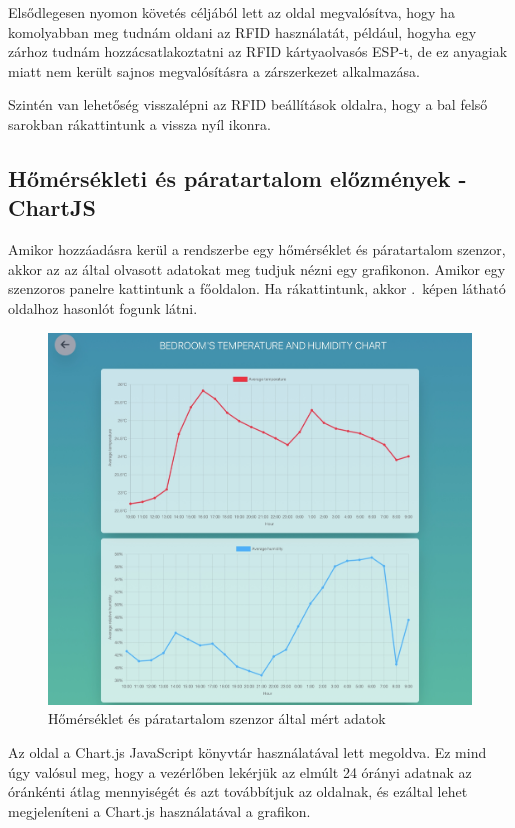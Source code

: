\documentclass[
]{thesis-ekf}
\theoremstyle{definition}
\theoremstyle{remark}
\begin{document}
	Elsődlegesen nyomon követés céljából lett az oldal megvalósítva, hogy ha komolyabban meg tudnám oldani az RFID használatát, például, hogyha egy zárhoz tudnám hozzácsatlakoztatni az RFID kártyaolvasós ESP-t, de ez anyagiak miatt nem került sajnos megvalósításra a zárszerkezet alkalmazása.
	
	Szintén van lehetőség visszalépni az RFID beállítások oldalra, hogy a bal felső sarokban rákattintunk a vissza nyíl ikonra.
	\subsection{Hőmérsékleti és páratartalom előzmények - ChartJS}
	
	Amikor hozzáadásra kerül a rendszerbe egy hőmérséklet és páratartalom szenzor, akkor az az által olvasott adatokat meg tudjuk nézni egy grafikonon. Amikor egy szenzoros panelre kattintunk a főoldalon. Ha rákattintunk, akkor .~képen látható oldalhoz hasonlót fogunk látni.
	
	\begin{figure}[ht!]
		\centering
		\includegraphics[width=1\textwidth]{./src/pages_img/humidity-chart}
		\caption{Hőmérséklet és páratartalom szenzor által mért adatok}
		\label{temp-hum-chart}
	\end{figure}

	Az oldal a Chart.js JavaScript könyvtár használatával lett megoldva. Ez mind úgy valósul meg, hogy a vezérlőben lekérjük az elmúlt 24 órányi adatnak az óránkénti átlag mennyiségét és azt továbbítjuk az oldalnak, és ezáltal lehet megjeleníteni a Chart.js használatával a grafikon.
	
\end{document}
